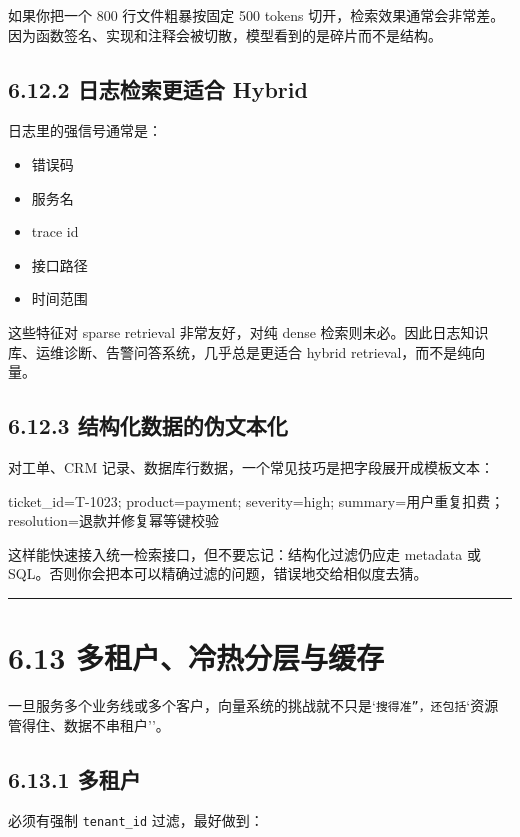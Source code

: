 如果你把一个 800 行文件粗暴按固定 500 tokens 切开，检索效果通常会非常差。因为函数签名、实现和注释会被切散，模型看到的是碎片而不是结构。


\subsection{6.12.2 日志检索更适合 Hybrid}

日志里的强信号通常是：


\begin{itemize}[leftmargin=2em]
\item 错误码
\item 服务名
\item trace id
\item 接口路径
\item 时间范围
\end{itemize}

这些特征对 sparse retrieval 非常友好，对纯 dense 检索则未必。因此日志知识库、运维诊断、告警问答系统，几乎总是更适合 hybrid retrieval，而不是纯向量。


\subsection{6.12.3 结构化数据的伪文本化}

对工单、CRM 记录、数据库行数据，一个常见技巧是把字段展开成模板文本：


\begin{codeblock}
ticket_id=T-1023; product=payment; severity=high;
summary=用户重复扣费；resolution=退款并修复幂等键校验
\end{codeblock}

这样能快速接入统一检索接口，但不要忘记：结构化过滤仍应走 metadata 或 SQL。否则你会把本可以精确过滤的问题，错误地交给相似度去猜。


\bigskip\hrule\bigskip

\section{6.13 多租户、冷热分层与缓存}

一旦服务多个业务线或多个客户，向量系统的挑战就不只是`\texttt{搜得准''，还包括}`资源管得住、数据不串租户''。


\subsection{6.13.1 多租户}

必须有强制 \texttt{tenant\_id} 过滤，最好做到：


